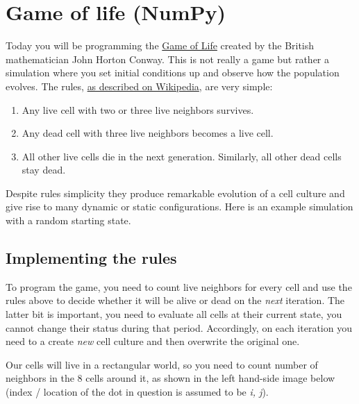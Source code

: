 \documentclass[
]{book}
\providecommand{\tightlist}{%
  \setlength{\itemsep}{0pt}\setlength{\parskip}{0pt}}
\begin{document}
\hypertarget{game-of-life-numpy}{%
\chapter{Game of life (NumPy)}\label{game-of-life-numpy}}

Today you will be programming the \href{https://en.wikipedia.org/wiki/Conway\%27s_Game_of_Life}{Game of Life} created by the British mathematician John Horton Conway. This is not really a game but rather a simulation where you set initial conditions up and observe how the population evolves. The rules, \href{https://en.wikipedia.org/wiki/Conway\%27s_Game_of_Life}{as described on Wikipedia}, are very simple:

\begin{enumerate}
\def\labelenumi{\arabic{enumi}.}
\tightlist
\item
  Any live cell with two or three live neighbors survives.
\item
  Any dead cell with three live neighbors becomes a live cell.
\item
  All other live cells die in the next generation. Similarly, all other dead cells stay dead.
\end{enumerate}

Despite rules simplicity they produce remarkable evolution of a cell culture and give rise to many dynamic or static configurations. Here is an example simulation with a random starting state.

\hypertarget{implementing-the-rules}{%
\section{Implementing the rules}\label{implementing-the-rules}}

To program the game, you need to count live neighbors for every cell and use the rules above to decide whether it will be alive or dead on the \emph{next} iteration. The latter bit is important, you need to evaluate all cells at their current state, you cannot change their status during that period. Accordingly, on each iteration you need to a create \emph{new} cell culture and then overwrite the original one.

Our cells will live in a rectangular world, so you need to count number of neighbors in the 8 cells around it, as shown in the left hand-side image below (index / location of the dot in question is assumed to be \emph{i, j}).
\end{document}
